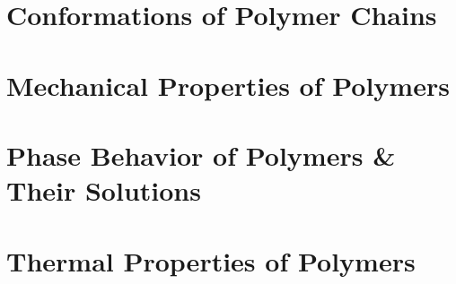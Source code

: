 \documentclass[letter,11pt,onecolumn]{memoir}
\begin{document}
	\chapter{Conformations of Polymer Chains}

	\chapter{Mechanical Properties of Polymers}

	\chapter{Phase Behavior of Polymers \& Their Solutions}

	\chapter{Thermal Properties of Polymers}





\backmatter
\end{document}
